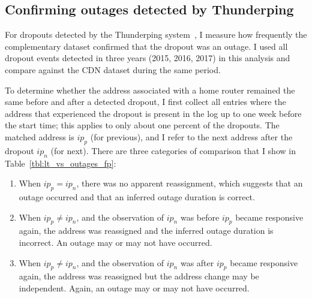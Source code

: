 
\subsection{Confirming outages detected by Thunderping}

For dropouts detected by the Thunderping system~\cite{pingin}, I
measure how frequently the complementary dataset confirmed that the
dropout was an outage. I used all dropout events detected in three
years (2015, 2016, 2017) in this analysis and compare against the CDN
dataset during the same period.

To determine whether the address associated with a home router remained the same before and after a detected dropout, I
first collect all entries where the address that experienced
the dropout is present in the log up to one week before the
start time; this applies to only about one percent of the
dropouts.  The matched address is $ip_p$ (for previous), and
I refer to the next address after the dropout $ip_n$ (for
next).  There are three categories of comparison that I
show in Table~\ref{tbl:lt_vs_outages_fp}:
\begin{enumerate}
\item When $ip_p = ip_n$, there was no apparent
  reassignment, which suggests that an outage occurred and that an inferred outage duration
  is correct.
\item When $ip_p \not= ip_n$, and the observation of $ip_n$
  was before $ip_p$ became responsive again, the address was
  reassigned and the inferred outage duration is incorrect. An outage may or may not have occurred.
\item When $ip_p \not= ip_n$, and the observation of $ip_n$
  was after $ip_p$ became responsive again, the address was
  reassigned but the address change may be independent. Again, an outage may or may not have occurred.
\end{enumerate}

